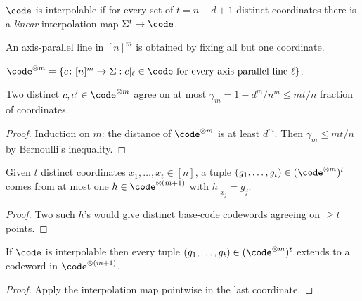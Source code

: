 \begin{definition}\label{def:interpolable}
  $\code$ is interpolable if for every set of $t=n-d+1$ distinct coordinates
  there is a \emph{linear} interpolation map $\Sigma^t\to\code$.
\end{definition}

\begin{definition}\label{def:axis-line}
  An axis-parallel line in $[n]^m$ is obtained by fixing all but one
  coordinate.
\end{definition}

\begin{definition}\label{def:tensor-code}
  $\code^{\otimes m}=\{c\colon[n]^m\to\Sigma : c|_\ell\in\code\text{ for every
  axis-parallel line }\ell\}$.
\end{definition}

\begin{proposition}\label{prop:distance}
  Two distinct $c,c'\in\code^{\otimes m}$ agree on at most
  $\gamma_m=1-d^m/n^m\le mt/n$ fraction of coordinates.
\end{proposition}
\begin{proof}
  Induction on $m$: the distance of $\code^{\otimes m}$ is at least $d^m$.
  Then $\gamma_m\le mt/n$ by Bernoulli's inequality.
\end{proof}

\begin{proposition}\label{prop:tuple-to-code-correspondence}
  Given $t$ distinct coordinates $x_1,\dots,x_t\in[n]$, a tuple
  $(g_1,\dots,g_t)\in(\code^{\otimes m})^t$ comes from at most one
  $h\in\code^{\otimes(m+1)}$ with $h|_{x_j}=g_j$.
\end{proposition}
\begin{proof}
  Two such $h$'s would give distinct base-code codewords agreeing on $\ge t$ points.
\end{proof}

\begin{proposition}\label{prop:interpolate-tuple}
  If $\code$ is interpolable then every tuple
  $(g_1,\dots,g_t)\in(\code^{\otimes m})^t$ extends to a codeword in
  $\code^{\otimes(m+1)}$.
\end{proposition}
\begin{proof}
  Apply the interpolation map pointwise in the last coordinate.
\end{proof}


